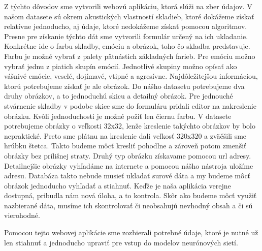 Z týchto dôvodov sme vytvorili webovú aplikáciu, ktorá slúži na zber údajov.
V našom datasete sú okrem akustických vlastností skladieb, ktoré dokážeme získať relatívne jednoducho, aj údaje, ktoré nedokážeme získať pomocou algoritmov.
Presne pre získanie týchto dát sme vytvorili formulár určený na ich ukladanie.
Konkrétne ide o farbu skladby, emóciu a obrázok, toho čo skladba predstavuje.
Farbu je možné vybrať z palety pätnástich základných farieb.
Pre emóciu možno vybrať jednu z piatich skupín emócií.
Jednotlivé skupiny možno opísať ako vášnivé emócie, veselé, dojímavé, vtipné a agresívne.
Najdôležitejšou informáciou, ktorú potrebujeme získať je ale obrázok.
Do nášho datasetu potrebujeme dva druhy obrázkov, a to jednoduchú skicu a detailný obrázok.
Pre jednouché stvárnenie skladby v podobe skice sme do formuláru pridali editor na nakreslenie obrázku.
Kvôli jednoduchosti je možné požiť len čiernu farbu.
V datasete potrebujeme obrázky o veľkosti 32x32, lenže kreslenie takýchto obrázkov by bolo nepraktické.
Preto sme plátnu na kreslenie dali veľkosť 320x320 a zväčšili sme hrúbku štetca.
Takto budeme môcť kresliť pohodlne a zároveň potom zmenšiť obrázky bez prílišnej straty.
Druhý typ obrázku získavame pomocou url adresy.
Detailnejšie obrázky vyhľadáme na internete a pomocou nášho nástroja uložíme adresu.
Databáza takto nebude musieť ukladať surové dáta a my budeme môcť obrázok jednoducho vyhľadať a stiahnuť.
Keďže je naša aplikácia verejne dostupná, pribudla nám nová úloha, a to kontrola.
Skôr ako budeme môcť využiť nazbierané dáta, musíme ich skontrolovať či neobsahujú nevhodný obsah a či sú vierohodné.

Pomocou tejto webovej aplikácie sme zozbierali potrebné údaje, ktoré je nutné už len stiahnuť a jednoducho upraviť pre vstup do modelov neurónových sietí.
